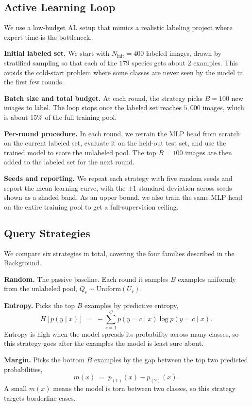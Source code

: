 \documentclass[11pt]{article}
\begin{document}
\subsection{Active Learning Loop}

We use a low-budget AL setup that mimics a realistic labeling project where
expert time is the bottleneck.

\textbf{Initial labeled set.} We start with $N_{\text{init}} = 400$ labeled
images, drawn by stratified sampling so that each of the $179$ species gets
about $2$ examples. This avoids the cold-start problem where some classes
are never seen by the model in the first few rounds.

\textbf{Batch size and total budget.} At each round, the strategy picks
$B = 100$ new images to label. The loop stops once the labeled set reaches
$5{,}000$ images, which is about $15\%$ of the full training pool.

\textbf{Per-round procedure.} In each round, we retrain the MLP head from
scratch on the current labeled set, evaluate it on the held-out test set,
and use the trained model to score the unlabeled pool. The top $B = 100$
images are then added to the labeled set for the next round.

\textbf{Seeds and reporting.} We repeat each strategy with five random
seeds and report the mean learning curve, with the $\pm 1$ standard
deviation across seeds shown as a shaded band. As an upper bound, we also
train the same MLP head on the entire training pool to get a
full-supervision ceiling.
\subsection{Query Strategies}

We compare six strategies in total, covering the four families described in
the Background.

\textbf{Random.} The passive baseline. Each round it samples $B$ examples
uniformly from the unlabeled pool, $Q_r \sim \text{Uniform}(U_r)$.

\textbf{Entropy.} Picks the top $B$ examples by predictive entropy,
\[
H[p(y \mid x)] \;=\; -\sum_{c=1}^{C} p(y = c \mid x) \log p(y = c \mid x).
\]
Entropy is high when the model spreads its probability across many classes,
so this strategy goes after the examples the model is least sure about.

\textbf{Margin.} Picks the bottom $B$ examples by the gap between the
top two predicted probabilities,
\[
m(x) \;=\; p_{(1)}(x) - p_{(2)}(x).
\]
A small $m(x)$ means the model is torn between two classes, so this
strategy targets borderline cases.
\end{document}
